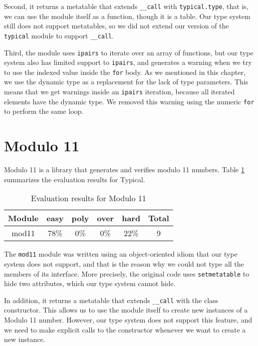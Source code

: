 Second, it returns a metatable that extends \texttt{\string_\string_call}
with \texttt{typical.type}, that is, we can use the module itself as a function,
though it is a table.
Our type system still does not support metatables, so we did not extend our version
of the \texttt{typical} module to support \texttt{\string_\string_call}.

Third, the module uses \texttt{ipairs} to iterate over an array of functions,
but our type system also has limited support to \texttt{ipairs}, and generates
a warning when we try to use the indexed value inside the \texttt{for} body.
As we mentioned in this chapter, we use the dynamic type as a replacement for
the lack of type parameters.
This means that we get warnings inside an \texttt{ipairs} iteration, because
all iterated elements have the dynamic type.
We removed this warning using the numeric \texttt{for} to perform the same loop.

\section{Modulo 11}

Modulo 11 is a library that generates and verifies modulo 11 numbers.
Table \ref{tab:evalmod11} summarizes the evaluation results for Typical.

\begin{table}[!ht]
\begin{center}
\begin{tabular}{|c|c|c|c|c|c|}
\hline
\textbf{Module} & \textbf{easy} & \textbf{poly} & \textbf{over} & \textbf{hard} & \textbf{Total} \\
\hline
mod11 & 78\% & 0\% & 0\% & 22\% & 9 \\ %
\hline
\end{tabular}
\end{center}
\caption{Evaluation results for Modulo 11}
\label{tab:evalmod11}
\end{table}

The \texttt{mod11} module was written using an object-oriented idiom that
our type system does not support, and that is the reason why we could not
type all the members of its interface.
More precisely, the original code uses \texttt{setmetatable} to hide
two attributes, which our type system cannot hide.

In addition, it returns a metatable that extends \texttt{\string_\string_call}
with the class constructor.
This allows us to use the module itself to create new instances of a
Modulo 11 number.
However, our type system does not support this feature, and we need to
make explicit calls to the constructor whenever we want to create a
new instance.

